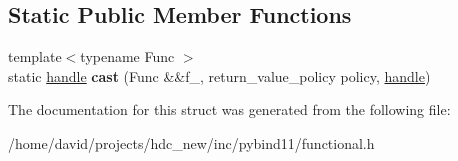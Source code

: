 \subsection*{Static Public Member Functions}
\begin{DoxyCompactItemize}
\item 
{\footnotesize template$<$typename Func $>$ }\\static \hyperlink{classhandle}{handle} {\bfseries cast} (Func \&\&f\+\_\+, return\+\_\+value\+\_\+policy policy, \hyperlink{classhandle}{handle})\hypertarget{structtype__caster_3_01std_1_1function_3_01_return_07_args_8_8_8_08_4_01_4_a1aa8ac47ff237f05e9d23bc199754e7a}{}\label{structtype__caster_3_01std_1_1function_3_01_return_07_args_8_8_8_08_4_01_4_a1aa8ac47ff237f05e9d23bc199754e7a}

\end{DoxyCompactItemize}


The documentation for this struct was generated from the following file\+:\begin{DoxyCompactItemize}
\item 
/home/david/projects/hdc\+\_\+new/inc/pybind11/functional.\+h\end{DoxyCompactItemize}
